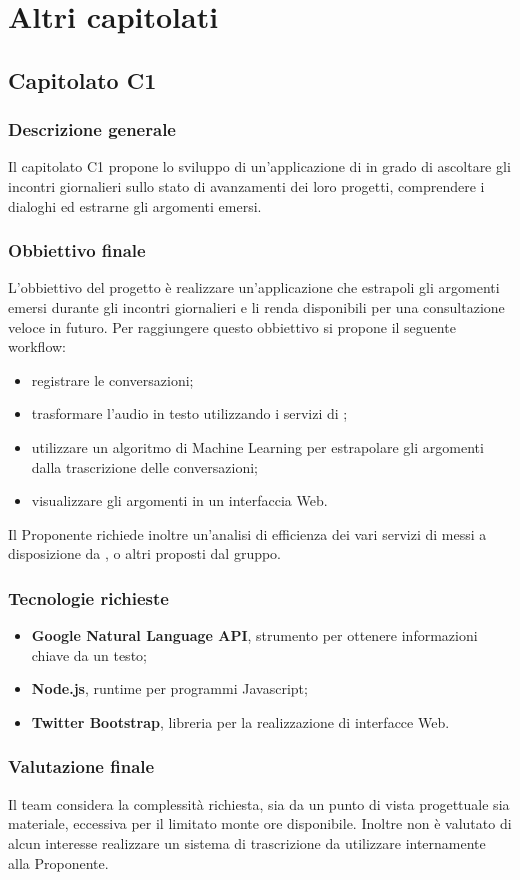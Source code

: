 \section{Altri capitolati}
\subsection{Capitolato C1}

\subsubsection{Descrizione generale}
Il capitolato C1 propone lo sviluppo di un'applicazione di  in grado di ascoltare gli incontri giornalieri sullo stato di avanzamenti dei loro progetti, comprendere i dialoghi ed estrarne gli argomenti emersi.

\subsubsection{Obbiettivo finale}
L'obbiettivo del progetto è realizzare un'applicazione che estrapoli gli argomenti emersi durante gli incontri giornalieri e li renda disponibili per una consultazione veloce in futuro.
Per raggiungere questo obbiettivo si propone il seguente workflow:
\begin{itemize}
\item registrare le conversazioni;
\item trasformare l'audio in testo utilizzando i servizi di ;
\item utilizzare un algoritmo di Machine Learning per estrapolare gli argomenti dalla trascrizione delle conversazioni;
\item visualizzare gli argomenti in un interfaccia Web.
\end{itemize}
Il Proponente richiede inoltre un'analisi di efficienza dei vari servizi di  messi a disposizione da ,  o altri proposti dal gruppo.

\subsubsection{Tecnologie richieste}
\begin{itemize}
\item \textbf{Google Natural Language API}, strumento per ottenere informazioni chiave da un testo;
\item \textbf{Node.js}, runtime per programmi Javascript;
\item \textbf{Twitter Bootstrap}, libreria per la realizzazione di interfacce Web.
\end{itemize}

\subsubsection{Valutazione finale}
Il team considera la complessità richiesta, sia da un punto di vista progettuale sia materiale, eccessiva per il limitato monte ore disponibile. 
Inoltre non è valutato di alcun interesse realizzare un sistema di trascrizione da utilizzare internamente alla Proponente.
